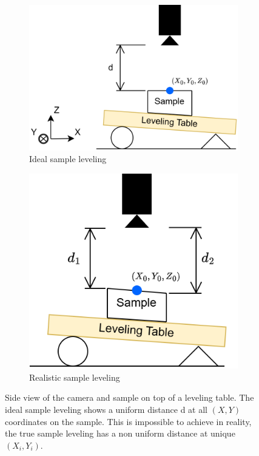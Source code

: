 \documentclass[a4paper,12pt]{article}
\begin{document}
\begin{figure}
  \centering
  \begin{subfigure}{.5\textwidth}
    \centering
    \includegraphics[height=0.5\linewidth]{../diagrams/sample_setup_ideal.png}
    \caption{Ideal sample leveling}
    \label{fig:ideal_levelling}
  \end{subfigure}%
  \begin{subfigure}{.5\textwidth}
    \centering
    \includegraphics[height=0.5\linewidth]{../diagrams/sample_setup_realistic.png}
    \caption{Realistic sample leveling}
    \label{fig:realistic_levelling}
  \end{subfigure}
  \caption{Side view of the camera and sample on top of a leveling table. The ideal sample leveling shows a uniform distance d at all $(X,Y)$ coordinates on the sample. This is impossible to achieve in reality, the true sample leveling has a non uniform distance at unique $(X_i, Y_i)$.}
  \label{fig:sample_levelling}
\end{figure}
\end{document}
